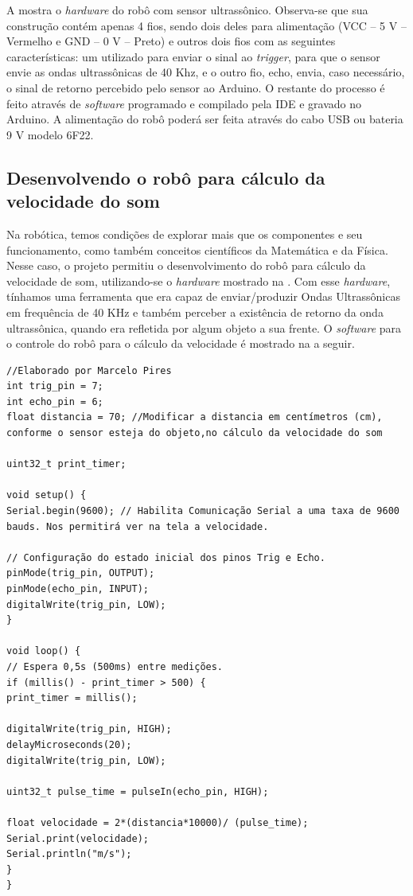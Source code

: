 \documentclass{textolivre}
\begin{document}
A  mostra o \textit{hardware} do robô com sensor ultrassônico. Observa-se que sua construção contém apenas 4 fios, sendo dois deles para alimentação (VCC – 5 V – Vermelho e GND – 0 V – Preto) e outros dois fios com as seguintes características: um utilizado para enviar o sinal ao \emph{trigger}, para que o sensor envie as ondas ultrassônicas de 40 Khz, e o outro fio, echo, envia, caso necessário, o sinal de retorno percebido pelo sensor ao Arduino. O restante do processo é feito através de \emph{software} programado e compilado pela IDE e gravado no Arduino. A alimentação do robô poderá ser feita através do cabo USB ou bateria 9 V modelo 6F22.

\subsection{Desenvolvendo o robô para cálculo da velocidade do som}\label{sec-3.1}
Na robótica, temos condições de explorar mais que os componentes e seu funcionamento, como também conceitos científicos da Matemática e da Física. Nesse caso, o projeto permitiu o desenvolvimento do robô para cálculo da velocidade de som, utilizando-se o \textit{hardware} mostrado na . Com esse \emph{hardware}, tínhamos uma ferramenta que era capaz de enviar/produzir Ondas Ultrassônicas em frequência de 40 KHz e também perceber a existência de retorno da onda ultrassônica, quando era refletida por algum objeto a sua frente. O \emph{software} para o controle do robô para o cálculo da velocidade é mostrado na  a seguir.

\begin{lstlisting}[label=lst01, caption={Programa para o cálculo da velocidade do som no Arduino.}, source={Arquivo pessoal.}]
//Elaborado por Marcelo Pires
int trig_pin = 7;
int echo_pin = 6;
float distancia = 70; //Modificar a distancia em centímetros (cm), conforme o sensor esteja do objeto,no cálculo da velocidade do som
 
uint32_t print_timer;
 
void setup() {
Serial.begin(9600); // Habilita Comunicação Serial a uma taxa de 9600 bauds. Nos permitirá ver na tela a velocidade.
 
// Configuração do estado inicial dos pinos Trig e Echo.
pinMode(trig_pin, OUTPUT);
pinMode(echo_pin, INPUT);
digitalWrite(trig_pin, LOW);
}
 
void loop() {
// Espera 0,5s (500ms) entre medições.
if (millis() - print_timer > 500) {
print_timer = millis();
 
digitalWrite(trig_pin, HIGH);
delayMicroseconds(20);
digitalWrite(trig_pin, LOW);
 
uint32_t pulse_time = pulseIn(echo_pin, HIGH);

float velocidade = 2*(distancia*10000)/ (pulse_time);
Serial.print(velocidade);
Serial.println("m/s");
}
}
\end{lstlisting} %
\end{document}
